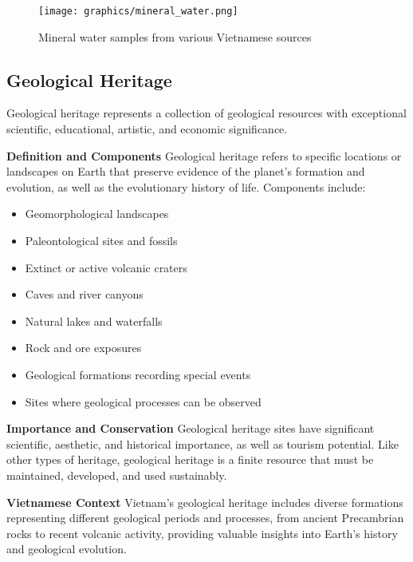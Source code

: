 \begin{figure}[H]
\centering
\texttt{[image: graphics/mineral\_water.png]}
\caption{Mineral water samples from various Vietnamese sources}
\label{fig:mineral_water}
\end{figure}

\subsection{Geological Heritage}

Geological heritage represents a collection of geological resources with exceptional scientific, educational, artistic, and economic significance.

\textbf{Definition and Components}
Geological heritage refers to specific locations or landscapes on Earth that preserve evidence of the planet's formation and evolution, as well as the evolutionary history of life. Components include:
\begin{itemize}
\item Geomorphological landscapes
\item Paleontological sites and fossils
\item Extinct or active volcanic craters
\item Caves and river canyons
\item Natural lakes and waterfalls
\item Rock and ore exposures
\item Geological formations recording special events
\item Sites where geological processes can be observed
\end{itemize}

\textbf{Importance and Conservation}
Geological heritage sites have significant scientific, aesthetic, and historical importance, as well as tourism potential. Like other types of heritage, geological heritage is a finite resource that must be maintained, developed, and used sustainably.

\textbf{Vietnamese Context}
Vietnam's geological heritage includes diverse formations representing different geological periods and processes, from ancient Precambrian rocks to recent volcanic activity, providing valuable insights into Earth's history and geological evolution.